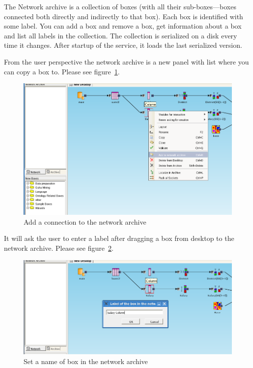 \documentclass[a4paper,12pt]{book}
\begin{document}
The Network archive is a collection of boxes (with all their sub-boxes---boxes connected both directly and indirectly to that box). Each box is identified with some label. You can add a box and remove a box, get information about a box and list all labels in the collection. The collection is serialized on a disk every time it changes. After startup of the service, it loads the last serialized version.

From the user perspective the network archive is a new panel with list where you can copy a box to. Please see figure~\ref{fig:addToNA}. 
\begin{figure}
	\includegraphics[width=1\textwidth]{add_to_network_archive}
	\caption{Add a connection to the network archive}
	\label{fig:addToNA}
\end{figure}

It will ask the user to enter a label after dragging a box from desktop to the network archive. Please see figure~\ref{fig:setNameInNA}.
\begin{figure}
	\includegraphics[width=1\textwidth]{set_name_of_box_in_network_archive}
	\caption{Set a name of box in the network archive}
	\label{fig:setNameInNA}
\end{figure}
\end{document}
